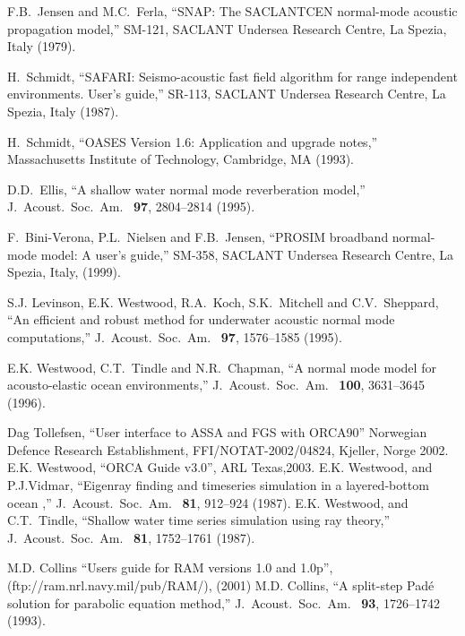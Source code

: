 \documentclass{saclantc}
\begin{document}
\begin{thebibliography}{11}

F.B.~Jensen and M.C.~Ferla,
\newblock ``{S}{N}{A}{P}: The SACLANTCEN normal-mode acoustic
propagation model,''
\newblock SM-121, SACLANT Undersea Research Centre, La Spezia, Italy (1979).

H.~Schmidt,
\newblock ``{S}{A}{F}{A}{R}{I}: Seismo-acoustic fast field algorithm for range
  independent environments. User's guide,''
\newblock SR-113, SACLANT Undersea Research Centre, La Spezia, Italy (1987).

H.~Schmidt,
\newblock ``{O}{A}{S}{E}{S} Version 1.6: Application and upgrade notes,''
\newblock Massachusetts Institute of Technology, Cambridge, MA (1993).

 D.D.\ Ellis, ``A shallow water normal mode reverberation model,''
{ J.\ Acoust.\ Soc.\ Am.\ } {\bf 97}, 2804--2814 (1995).

F.\ Bini-Verona, P.L.\ Nielsen and F.B.~Jensen, ``PROSIM broadband
normal-mode model: A user's guide,'' 
SM-358, SACLANT Undersea Research Centre, La Spezia, Italy, (1999).

S.J. Levinson, E.K. Westwood, R.A.\ Koch, S.K.\ Mitchell and C.V.\
Sheppard, ``An efficient and robust method for underwater acoustic 
 normal mode computations,''
{ J.\ Acoust.\ Soc.\ Am.\ } {\bf 97}, 1576--1585 (1995).

E.K. Westwood, C.T.\ Tindle and N.R.\ Chapman, ``A normal mode model for acousto-elastic ocean environments,''
{ J.\ Acoust.\ Soc.\ Am.\ } {\bf 100}, 3631--3645 (1996).

Dag Tollefsen, ``User interface to ASSA and FGS with ORCA90''
Norwegian Defence Research Establishment,  FFI/NOTAT-2002/04824, Kjeller, Norge 2002.
\bibitem{westwood03}
E.K. Westwood, ``ORCA Guide v3.0'', ARL Texas,2003.
E.K. Westwood, and P.J.Vidmar, ``Eigenray finding and timeseries
simulation in a layered-bottom ocean ,''
{ J.\ Acoust.\ Soc.\ Am.\ } {\bf 81}, 912--924 (1987).
E.K. Westwood, and C.T.\ Tindle, ``Shallow water time series
simulation using ray theory,''
{ J.\ Acoust.\ Soc.\ Am.\ } {\bf 81}, 1752--1761 (1987).

 M.D. Collins ``Users guide for RAM versions 1.0
and 1.0p'', (ftp://ram.nrl.navy.mil/pub/RAM/), (2001)
M.D. Collins, ``A split-step Pad\'{e} solution for parabolic equation method,''
{ J.\ Acoust.\ Soc.\ Am.\ } {\bf 93}, 1726--1742 (1993).


\end{thebibliography}
\end{document}
